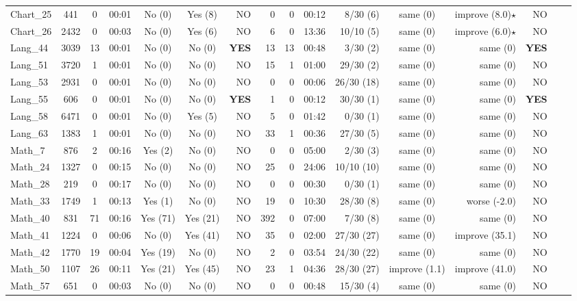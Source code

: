 \begin{table*}[htbp]
\begin{tabular}{|l|c|c|c|c|c|r|r|r|r|r|c|r|r|r|r|}
Chart\_25 & 441 & 0 & 00:01 & No (0) & Yes (8) & NO & 0 & 0 & 00:12 & 8/30 (6) &  same (0) & improve (8.0)$\star$ & NO\\
Chart\_26 & 2432 & 0 & 00:03 & No (0) & Yes (6) & NO & 6 & 0 & 13:36 & 10/10 (5) &  same (0) & improve (6.0)$\star$ & NO \\
Lang\_44 & 3039 & 13 & 00:01 & No (0) & No (0) & \bf{YES} & 13 & 13 & 00:48 & 3/30 (2) & same (0) & same (0) & \bf{YES}\\
Lang\_51 & 3720 & 1 & 00:01 & No (0) & No (0) & NO & 15 & 1 & 01:00 & 29/30 (2) &  same (0) & same (0) & NO\\
Lang\_53 & 2931 & 0 & 00:01 & No (0) & No (0) & NO & 0 & 0 & 00:06 & 26/30 (18) &  same (0) &  same (0) & NO\\
Lang\_55 & 606 & 0 & 00:01 & No (0) & No (0) & \bf{YES} & 1 & 0 & 00:12 & 30/30 (1) & same (0) & same (0) & \bf{YES}\\
Lang\_58 & 6471 & 0 & 00:01 & No (0) & Yes (5) & NO & 5 & 0 & 01:42 & 0/30 (1) &  same (0) & same (0) & NO\\
Lang\_63 & 1383 & 1 & 00:01 & No (0) & No (0) & NO & 33 & 1 & 00:36 & 27/30 (5) & same (0) & same (0) & NO\\
Math\_7 & 876 & 2 & 00:16 & Yes (2) & No (0) & NO & 0 & 0 & 05:00 & 2/30 (3) & same (0) &  same (0) & NO\\
Math\_24 & 1327 & 0 & 00:15 & No (0) & No (0) & NO & 25 & 0 & 24:06 & 10/10 (10) & same (0) & same (0) & NO\\
Math\_28 & 219 & 0 & 00:17 & No (0) & No (0) & NO & 0 & 0 & 00:30 & 0/30 (1) & same (0) & same (0) & NO\\
Math\_33 & 1749 & 1 & 00:13 & Yes (1) & No (0) & NO & 19 & 0 & 10:30 & 28/30 (8) & same (0) & worse (-2.0) & NO\\
Math\_40 & 831 & 71 & 00:16 & Yes (71) & Yes (21) & NO & 392 & 0 & 07:00 & 7/30 (8) & same (0) & same (0) & NO\\
Math\_41 & 1224 & 0 & 00:06 & No (0) & Yes (41) & NO  & 35 & 0 & 02:00 & 27/30 (27) &  same (0) & improve (35.1) & NO\\
Math\_42 & 1770 & 19 & 00:04 & Yes (19) & No (0) & NO & 2 & 0 & 03:54 & 24/30 (22) &  same (0) & same (0) & NO\\
Math\_50 & 1107 & 26 & 00:11 & Yes (21) & Yes (45) & NO  & 23 & 1 & 04:36 & 28/30 (27) & improve (1.1) & improve (41.0) & NO\\
Math\_57 & 651 & 0 & 00:03 & No (0) & No (0) & NO & 0 & 0 & 00:48 & 15/30 (4) &  same (0) & same (0) & NO\\

\end{tabular}
\end{table*}
